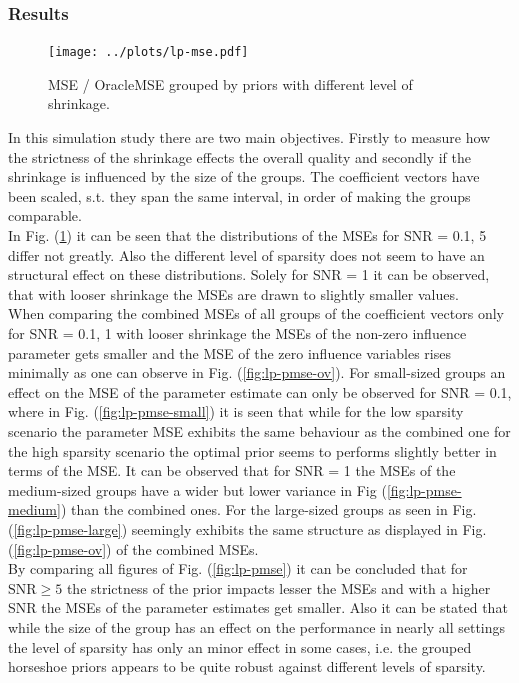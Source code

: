\documentclass[12pt,letterpaper]{article}
\numberwithin{equation}{subsection}
\begin{document}
\subsubsection{Results}
\label{sec:lpres}
\begin{figure}[hbt!]
 \centering
 \texttt{[image: ../plots/lp-mse.pdf]}
 \caption[MSE / OracleMSE (linear predictor scenario)]{MSE / OracleMSE grouped by priors with different level of shrinkage.}
 \label{fig:lp-mse}
\end{figure}
In this simulation study there are two main objectives. Firstly to measure how the strictness of the shrinkage effects the overall quality and secondly if the shrinkage is influenced by the size of the groups. The coefficient vectors have been scaled, s.t. they span the same interval, in order of making the groups comparable. \\
In Fig. (\ref{fig:lp-mse}) it can be seen that the distributions of the MSEs for SNR = 0.1, 5 differ not greatly. Also the different level of sparsity does not seem to have an structural effect on these distributions. Solely for SNR = 1 it can be observed, that with looser shrinkage the MSEs are drawn to slightly smaller values. \\ 
When comparing the combined MSEs of all groups of the coefficient vectors only for SNR = 0.1, 1 with looser shrinkage the MSEs of the non-zero influence parameter gets smaller and the MSE of the zero influence variables rises minimally as one can observe in Fig. (\ref{fig:lp-pmse-ov}). For small-sized groups an effect on the MSE of the parameter estimate can only be observed for SNR = 0.1, where in Fig. (\ref{fig:lp-pmse-small}) it is seen that while for the low sparsity scenario the parameter MSE exhibits the same behaviour as the combined one for the high sparsity scenario the optimal prior seems to performs slightly better in terms of the MSE. 
It can be observed that for SNR = 1 the MSEs of the medium-sized groups have a wider but lower variance in Fig (\ref{fig:lp-pmse-medium}) than the combined ones. For the large-sized groups as seen in Fig. (\ref{fig:lp-pmse-large}) seemingly exhibits the same structure as displayed in Fig. (\ref{fig:lp-pmse-ov})  of the combined MSEs. \\ By comparing all figures of Fig. (\ref{fig:lp-pmse}) it can be concluded that for $\text{SNR} \geq 5$ the strictness of the prior impacts lesser the MSEs and with a higher SNR the MSEs of the parameter estimates get smaller. Also it can be stated that while the size of the group has an effect on the performance in nearly all settings the level of sparsity has only an minor effect in some cases, i.e. the grouped horseshoe priors appears to be quite robust against different levels of sparsity.
\end{document}
